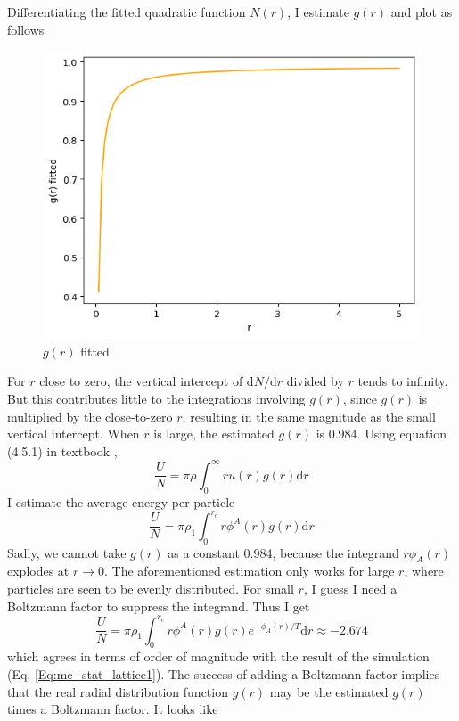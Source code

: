 \documentclass[letterpaper,12pt]{article}
\numberwithin{equation}{section}
\begin{document}
Differentiating the fitted quadratic function $N(r)$, I estimate $g(r)$ and plot as follows
\begin{figure}[H]
    \centering
    \includegraphics{Project/g_fitted.png}
    \caption{$g(r)$ fitted}
    \label{fig:g_fitted}
\end{figure}
For $r$ close to zero, the vertical intercept of $\mathrm{d}N/\mathrm{d}r$ divided by $r$ tends to infinity. But this contributes little to the integrations involving $g(r)$, since
$g(r)$ is multiplied by the close-to-zero $r$, resulting in the same magnitude as the small vertical intercept. When $r$ is large,  the estimated $g(r)$ is $0.984$. Using equation (4.5.1) in textbook \cite{UMS}, 
\begin{equation}
    \frac{U}{N}=\pi\rho\int_0^{\infty}{ru(r)g(r)\mathrm{d}r}
\end{equation}
I estimate the average energy per particle
\begin{equation}
    \frac{U}{N}=\pi\rho_1\int_0^{r_c}{r\phi^A(r)g(r)\mathrm{d}r}
\end{equation}
Sadly, we cannot take $g(r)$ as a constant 0.984, because the integrand $r\phi_A(r)$ explodes at $r\rightarrow0$. The aforementioned estimation only works for large $r$, where particles are seen to be evenly distributed. For small $r$, I guess I need a Boltzmann factor to suppress the integrand. Thus I get 
\begin{equation}
    \frac{U}{N}=\pi\rho_1\int_0^{r_c}{r\phi^A(r)g(r)e^{-\phi_A(r)/T}\mathrm{d}r}\approx -2.674
\end{equation}
which agrees in terms of order of magnitude with the result of the simulation (Eq. \ref{Eq:mc_stat_lattice1}). The success of adding a Boltzmann factor implies that the real radial distribution function $g(r)$ may be the estimated $g(r)$ times a Boltzmann factor. It looks like 
\end{document}

